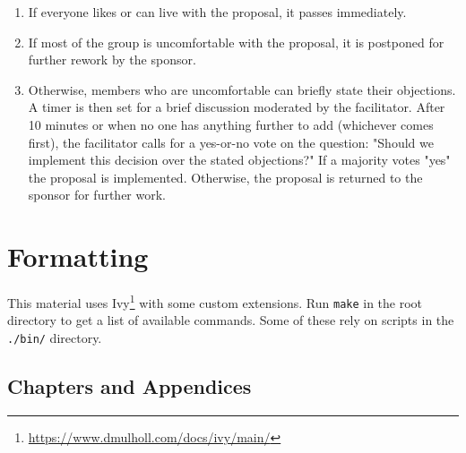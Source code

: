 \documentclass{scrbook}
\newcommand{\hreffoot}[2]{{#1}\footnote{\href{#2}{#2}}}
\begin{document}
\begin{enumerate}
\begin{itemize}
\end{itemize}



\item 

If everyone likes or can live with the proposal, it passes immediately.



\item 

If most of the group is uncomfortable with the proposal, it is postponed for
    further rework by the sponsor.



\item 

Otherwise, members who are uncomfortable can briefly state their objections.
    A timer is then set for a brief discussion moderated by the facilitator.
    After 10 minutes or when no one has anything further to add (whichever comes
    first), the facilitator calls for a yes-or-no vote on the question: "Should
    we implement this decision over the stated objections?"  If a majority votes
    "yes" the proposal is implemented.  Otherwise, the proposal is returned to
    the sponsor for further work.



\end{enumerate}

\section*{Formatting}


This material uses \hreffoot{Ivy}{https://www.dmulholl.com/docs/ivy/main/} with some custom extensions.
Run \texttt{make} in the root directory to get a list of available commands.
Some of these rely on scripts in the \texttt{./bin/} directory.

\subsection*{Chapters and Appendices}
\end{document}
